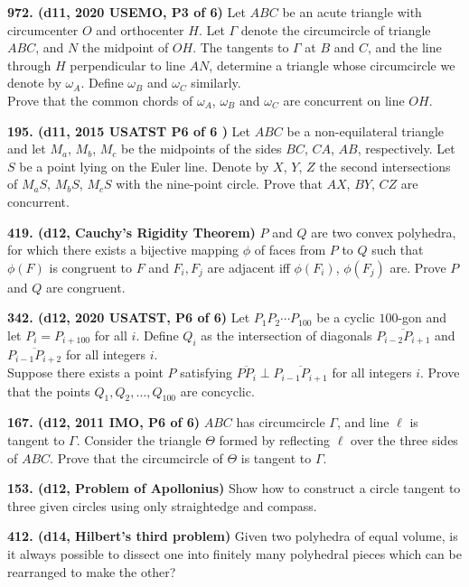 \documentclass{article}
\begin{document}
\textbf{972. (\color{red}d11\color{black}, 2020 USEMO, P3 of 6)} Let $ABC$ be an acute triangle with circumcenter $O$ and orthocenter $H$. Let $\Gamma$ denote the circumcircle of triangle $ABC$, and $N$ the midpoint of $OH$. The tangents to $\Gamma$ at $B$ and $C$, and the line through $H$ perpendicular to line $AN$, determine a triangle whose circumcircle we denote by $\omega_A$. Define $\omega_B$ and $\omega_C$ similarly. \\
Prove that the common chords of $\omega_A$, $\omega_B$ and $\omega_C$ are concurrent on line $OH$.

\textbf{195. (\color{red}d11\color{black}, 2015 USATST P6 of 6 )} Let $ABC$ be a non-equilateral triangle and let $M_a$, $M_b$, $M_c$ be the midpoints of the sides $BC$, $CA$, $AB$, respectively.  Let $S$ be a point lying on the Euler line. Denote by $X$, $Y$, $Z$ the second intersections of $M_aS$, $M_bS$, $M_cS$ with the nine-point circle. Prove that $AX$, $BY$, $CZ$ are concurrent.

\textbf{419. (\color{red}d12\color{black}, Cauchy's Rigidity Theorem)} $P$ and $Q$ are two convex polyhedra, for which there exists a bijective mapping $\phi$ of faces from $P$ to $Q$ such that $\phi(F)$ is congruent to $F$ and $F_i, F_j$ are adjacent iff $\phi(F_i)$, $\phi(F_j)$ are. Prove $P$ and $Q$ are congruent.

\textbf{342. (\color{red}d12\color{black}, 2020 USATST, P6 of 6)} Let $P_1P_2\dotsb P_{100}$ be a cyclic $100$-gon and let $P_i = P_{i+100}$ for all $i$. Define $Q_i$ as the intersection of diagonals $\overline{P_{i-2}P_{i+1}}$ and $\overline{P_{i-1}P_{i+2}}$ for all integers $i$. \\  Suppose there exists a point $P$ satisfying $\overline{PP_i}\perp\overline{P_{i-1}P_{i+1}}$ for all integers $i$. Prove that the points $Q_1,Q_2,\dots, Q_{100}$ are concyclic.

\textbf{167. (\color{red}d12\color{black}, 2011 IMO, P6 of 6)} $ABC$ has circumcircle $\Gamma$, and line $\ell$ is tangent to $\Gamma$. Consider the triangle $\Theta$ formed by reflecting $\ell$ over the three sides of $ABC$. Prove that the circumcircle of $\Theta$ is tangent to $\Gamma$.

\textbf{153. (\color{red}d12\color{black}, Problem of Apollonius)} Show how to construct a circle tangent to three given circles using only straightedge and compass.

\textbf{412. (\color{red}d14\color{black}, Hilbert's third problem)} Given two polyhedra of equal volume, is it always possible to dissect one into finitely many polyhedral pieces which can be rearranged to make the other?
\end{document}
